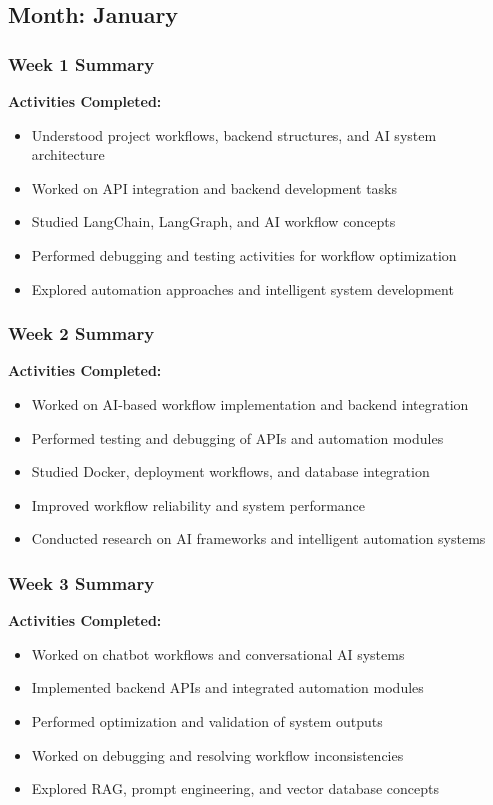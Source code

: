 \documentclass[12pt,a4paper]{report}
\begin{document}
\subsection*{Month: January}

\subsubsection*{Week 1 Summary}
\textbf{Activities Completed:}
\begin{itemize}[leftmargin=1.5cm]
    \item Understood project workflows, backend structures, and AI system architecture
    \item Worked on API integration and backend development tasks
    \item Studied LangChain, LangGraph, and AI workflow concepts
    \item Performed debugging and testing activities for workflow optimization
    \item Explored automation approaches and intelligent system development
\end{itemize}

\subsubsection*{Week 2 Summary}
\textbf{Activities Completed:}
\begin{itemize}[leftmargin=1.5cm]
    \item Worked on AI-based workflow implementation and backend integration
    \item Performed testing and debugging of APIs and automation modules
    \item Studied Docker, deployment workflows, and database integration
    \item Improved workflow reliability and system performance
    \item Conducted research on AI frameworks and intelligent automation systems
\end{itemize}

\subsubsection*{Week 3 Summary}
\textbf{Activities Completed:}
\begin{itemize}[leftmargin=1.5cm]
    \item Worked on chatbot workflows and conversational AI systems
    \item Implemented backend APIs and integrated automation modules
    \item Performed optimization and validation of system outputs
    \item Worked on debugging and resolving workflow inconsistencies
    \item Explored RAG, prompt engineering, and vector database concepts
\end{itemize}
\end{document}
